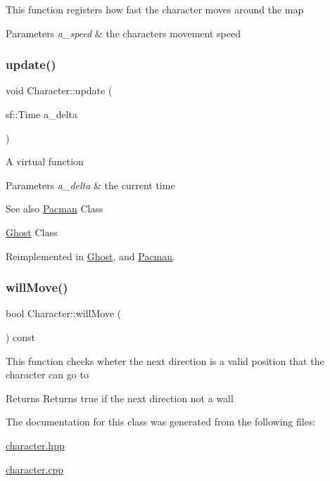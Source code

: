 This function registers how fast the character moves around the map


\begin{DoxyParams}{Parameters}
{\em a\+\_\+speed} & the character\textquotesingle{}s movement speed \\
\hline
\end{DoxyParams}
\mbox{\label{class_character_a89b72b507971ba8648909980d045ed06}} 
\subsubsection{\texorpdfstring{update()}{update()}}
{\footnotesize\ttfamily void Character\+::update (\begin{DoxyParamCaption}\item[{sf\+::\+Time}]{a\+\_\+delta }\end{DoxyParamCaption})\hspace{0.3cm}{\ttfamily [virtual]}}

A virtual function


\begin{DoxyParams}{Parameters}
{\em a\+\_\+delta} & the current time \\
\hline
\end{DoxyParams}
\begin{DoxySeeAlso}{See also}
\hyperlink{class_pacman}{Pacman} Class 

\hyperlink{class_ghost}{Ghost} Class 
\end{DoxySeeAlso}


Reimplemented in \hyperlink{class_ghost_a164e0607f7ea0d72d756bdf964e66b90}{Ghost}, and \hyperlink{class_pacman_a6badb47a28223991a1eb540f9d970e77}{Pacman}.

\mbox{\label{class_character_a53d02c2b1c914990e51e0fb84913d151}} 
\subsubsection{\texorpdfstring{will\+Move()}{willMove()}}
{\footnotesize\ttfamily bool Character\+::will\+Move (\begin{DoxyParamCaption}{ }\end{DoxyParamCaption}) const}

This function checks wheter the next direction is a valid position that the character can go to

\begin{DoxyReturn}{Returns}
Returns true if the next direction not a wall 
\end{DoxyReturn}


The documentation for this class was generated from the following files\+:\begin{DoxyCompactItemize}
\item 
\hyperlink{character_8hpp}{character.\+hpp}\item 
\hyperlink{character_8cpp}{character.\+cpp}\end{DoxyCompactItemize}
